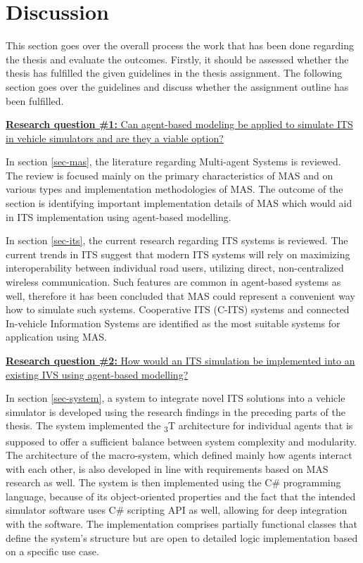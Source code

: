 \documentclass[0main.tex]{subfiles}
\begin{document}
\section{Discussion}

This section goes over the overall process the work that has been done regarding the thesis
and evaluate the outcomes.  Firstly, it should be assessed whether the thesis has fulfilled the
given guidelines in the thesis assignment. The following section goes over the guidelines
and discuss whether the assignment outline has been fulfilled. 

\ul{\textbf{Research question \#1:} Can agent-based modeling be applied to simulate ITS in
vehicle simulators and are they a viable option?}

In section \ref{sec-mas}, the literature regarding Multi-agent Systems is reviewed. The review
is focused mainly on the primary characteristics of MAS and on various types and implementation
methodologies of MAS. The outcome of the section is identifying important implementation
details of MAS which would aid in ITS implementation using agent-based modelling. 

In section \ref{sec-its}, the current research regarding ITS systems is reviewed. The current
trends in ITS suggest that modern ITS systems will rely on maximizing interoperability between
individual road users, utilizing direct, non-centralized wireless communication. Such features
are common in agent-based systems as well, therefore it has been concluded that MAS could
represent a convenient way how to simulate such systems. Cooperative ITS (C-ITS) systems and
connected In-vehicle Information Systems are identified as the most suitable systems for
application using MAS.

\ul{\textbf{Research question \#2:} How would an ITS simulation be implemented into an existing
IVS using agent-based modelling?}

In section \ref{sec-system}, a system to integrate novel ITS solutions into a vehicle simulator
is developed using the research findings in the preceding parts of the thesis. The system
implemented the \textsubscript{3}T architecture for individual agents that is supposed to
offer a sufficient balance between system complexity and modularity. The architecture of the
macro-system, which defined mainly how agents interact with each other, is also developed
in line with requirements based on MAS research as well. The system is then implemented using
the C\# programming language, because of its object-oriented properties and the fact that the
intended simulator software uses C\# scripting API as well, allowing for deep integration with
the software. The implementation comprises partially functional classes that define the
system's structure but are open to detailed logic implementation based on a specific use
case. 
\end{document}
